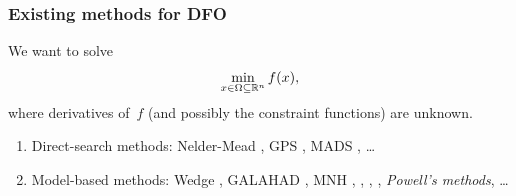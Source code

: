 \documentclass{polyu-presentation}
\newcommand{\fset}{\Omega}
\newcommand{\iter}[1][]{x\ifthenelse{\equal{#1}{}}{}{^{#1}}}
\newcommand{\obj}{f}
\begin{document}
\begin{frame}
    \frametitle{Existing methods for DFO}

    We want to solve
    \begin{equation*}
        \min_{\iter \in \fset \subseteq \R^n} \obj(\iter),
    \end{equation*}
    where derivatives of~$\obj$ (and possibly the constraint functions) are \alert{unknown}.

    \bigskip

    \begin{block}{}
        \begin{enumerate}
            \item \alert{Direct-search methods}: Nelder-Mead \parencite{Nelder_Mead_1965}, GPS \parencite{Booker_Etal_1999}, MADS \parencite{Audet_Dennis_2006}, \dots
            \item \alert{Model-based methods}: Wedge \parencite{Marazzi_Nocedal_2002}, GALAHAD \parencite{Gould_Orban_Toint_2003}, MNH \parencite{Wild_2008}, \textcite{Fasano_Morales_Nocedal_2009}, \textcite{Jarre_Lieder_2017}, \textcite{Conejo_Karas_Pedroso_2015}, \emph{Powell's methods}, \dots
        \end{enumerate}
    \end{block}
    
\end{frame}
\end{document}
